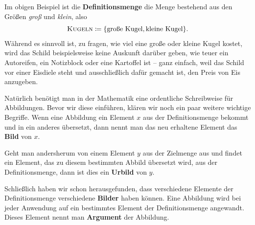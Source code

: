 \documentclass[../../main.tex]{subfiles}
\begin{document}
\begin{example}
    Im obigen Beispiel ist die \textbf{Definitionsmenge} die Menge bestehend aus den Größen \emph{groß} und \emph{klein}, also 
    \[\textsc{Kugeln}\coloneqq\{\text{große Kugel},\text{kleine Kugel}\}.\]
    Während es sinnvoll ist, zu fragen, wie viel eine große oder kleine Kugel kostet, wird das Schild beispielsweise keine Auskunft darüber geben, wie teuer ein Autoreifen, ein Notizblock oder eine Kartoffel ist -- ganz einfach, weil das Schild vor einer Eisdiele steht und ausschließlich dafür gemacht ist, den Preis von Eis anzugeben.
\end{example}

Natürlich benötigt man in der Mathematik eine ordentliche Schreibweise für Abbildungen. Bevor wir diese einführen, klären wir noch ein paar weitere wichtige Begriffe. Wenn eine Abbildung ein Element $x$ aus der Definitionsmenge bekommt und in ein anderes übersetzt, dann nennt man das neu erhaltene Element das \textbf{Bild} von $x$.

Geht man andersherum von einem Element $y$ aus der Zielmenge aus und findet ein Element, das zu diesem bestimmten Abbild übersetzt wird, aus der Definitionsmenge, dann ist dies ein \textbf{Urbild} von $y$.

Schließlich haben wir schon herausgefunden, dass verschiedene Elemente der Definitionsmenge verschiedene \textbf{Bilder} haben können. Eine Abbildung wird bei jeder Anwendung auf ein bestimmtes Element der Definitionsmenge angewandt. Dieses Element nennt man \textbf{Argument} der Abbildung.
\end{document}
